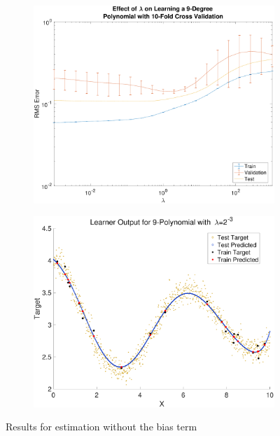\documentclass{report}
\begin{document}
  \begin{figure}[h]
    \centering
    \begin{subfigure}[h]{ 0.45\linewidth}
      \includegraphics[width=\linewidth]{lambda_sweep_without_bias}
    \end{subfigure}
    \begin{subfigure}[h]{ 0.45\linewidth}
      \includegraphics[width=\linewidth]{without_bias_comparison}
    \end{subfigure}
    \caption{Results for estimation without the bias term}\label{fig:withoutbias}
  \end{figure}
\end{document}
